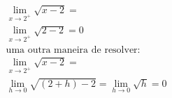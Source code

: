 \begin{ex}
\begin{align}
&\lim_{x\rightarrow 2^+} \sqrt{x-2}=\nonumber\\
&\lim_{x\rightarrow 2^+} \sqrt{2-2}=0\nonumber\\
&\text{uma outra maneira de resolver:}\nonumber\\
&\lim_{x\rightarrow 2^+} \sqrt{x-2}=\nonumber\\
&\lim_{h\rightarrow 0} \sqrt{(2+h)-2}=\lim_{h\rightarrow 0} \sqrt{h}=0\nonumber
\end{align}
\end{ex}
